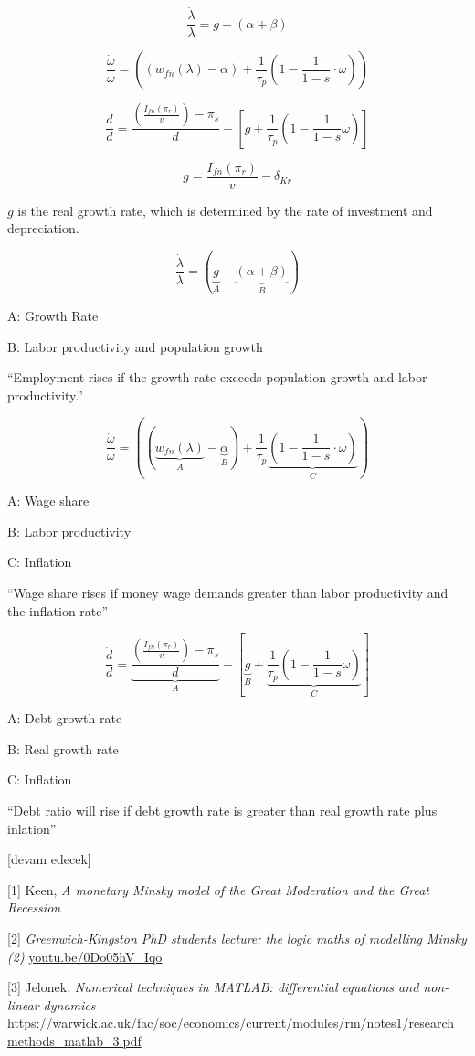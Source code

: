 \documentclass[12pt,fleqn]{article}\usepackage{../../common}
\begin{document}
\newpage


$$ 
\frac{\dot{\lambda}}{\lambda} =
  g - (\alpha + \beta)
$$

$$ 
\frac{\dot{\omega}}{\omega} = 
\left( 
(w_{fn}(\lambda) - \alpha) + \frac{1}{\tau_p} \left( 1-\frac{1}{1-s} \cdot \omega\right)
\right)
$$


$$ 
\frac{\dot{d}}{d} = 
\frac{\left( \frac{I_{fn}(\pi_r)}{v} \right) - \pi_s }{d} - 
\left[ 
g + \frac{1}{\tau_p} \left(1 - \frac{1}{1-s} \omega\right)
\right]
$$


$$ g = \frac{I_{fn}(\pi_r)}{v} - \delta_{Kr} $$

$g$ is the real growth rate, which is determined by the rate of investment
and depreciation.


\newpage



$$ 
\frac{\dot{\lambda}}{\lambda} =
\left( 
  \underbrace{ g }_{A} - 
  \underbrace{ (\alpha + \beta) }_{B}
\right)
$$

A: Growth Rate

B: Labor productivity and population growth

``Employment rises if the growth rate exceeds population growth and labor productivity.''


$$ 
\frac{\dot{\omega}}{\omega} = 
\left( 
(\underbrace{w_{fn}(\lambda)}_{A} - \underbrace{\alpha}_{B}) + \frac{1}{\tau_p}
\underbrace{\left( 1-\frac{1}{1-s} \cdot \omega \right)}_{C}
\right)
$$

A: Wage share 

B: Labor productivity

C: Inflation

``Wage share rises if money wage demands greater than labor productivity and
the inflation rate''



$$ 
\frac{\dot{d}}{d} = 
\underbrace{\frac{\left( \frac{I_{fn}(\pi_r)}{v} \right) - \pi_s }{d}}_{A} - 
\left[ 
\underbrace{g }_{B}+ 
\underbrace{\frac{1}{\tau_p} \left(1 - \frac{1}{1-s} \omega\right)}_{C}
\right]
$$

A: Debt growth rate

B: Real growth rate

C: Inflation

``Debt ratio will rise if debt growth rate is greater than real growth rate plus inlation''








[devam edecek]



[1] Keen, {\em A monetary Minsky model of the Great Moderation and the Great Recession}

[2] {\em Greenwich-Kingston PhD students lecture: the logic  maths of modelling Minsky (2)} \url{youtu.be/0Do05hV_Iqo}

[3] Jelonek, {\em Numerical techniques in MATLAB: differential equations and non-linear dynamics} \url{https://warwick.ac.uk/fac/soc/economics/current/modules/rm/notes1/research_methods_matlab_3.pdf}
\end{document}
